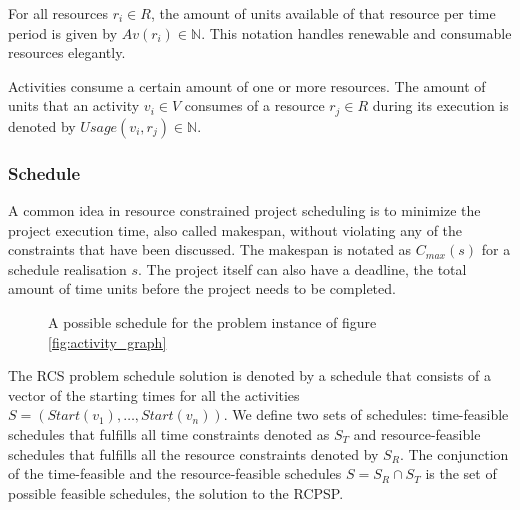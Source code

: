 \documentclass{article}
\newcommand{\res}[0]{\ensuremath{R}} %
\newcommand{\av}[1]{\ensuremath{Av(r_{#1})}} %
\newcommand{\usage}[2]{\ensuremath{Usage(v_{#1}, r_{#2})}} %
\newcommand{\start}[1]{\ensuremath{Start(v_{#1})}} %
\newcommand{\makespan}[1]{\ensuremath{C_{max}(#1)}} %
\begin{document}
For all resources $r_i \in \res$, the amount of units available of that resource per time period is given by $\av{i} \in \mathbb{N}$. 
This notation handles renewable and consumable resources elegantly. 

Activities consume a certain amount of one or more resources.
The amount of units that an activity $v_i \in V$ consumes of a resource $r_j \in \res$ during its execution is denoted by $\usage{i}{j} \in \mathbb{N}$. 

\subsubsection{Schedule}
A common idea in resource constrained project scheduling is to minimize the project execution time, also called makespan, without violating any of the constraints that have been discussed. 
The makespan is notated as \makespan{s} for a schedule realisation $s$. 
The project itself can also have a deadline, the total amount of time units before the project needs to be completed.

\begin{figure}[h]
	\centering
	
	\caption{A possible schedule for the problem instance of figure \ref{fig:activity_graph}}
	\label{fig:time_schedule}
\end{figure}

The RCS problem schedule solution is denoted by a schedule that consists of a vector of the starting times for all the activities $S =  (\start{1}, \ldots, \start{n})$.
We define two sets of schedules: time-feasible schedules that fulfills all time constraints denoted as $S_T$ and resource-feasible schedules that fulfills all the resource constraints denoted by $S_R$. 
The conjunction of the time-feasible and the resource-feasible schedules $S = S_R \cap S_T$ is the set of possible feasible schedules, the solution to the RCPSP. 
\end{document}
